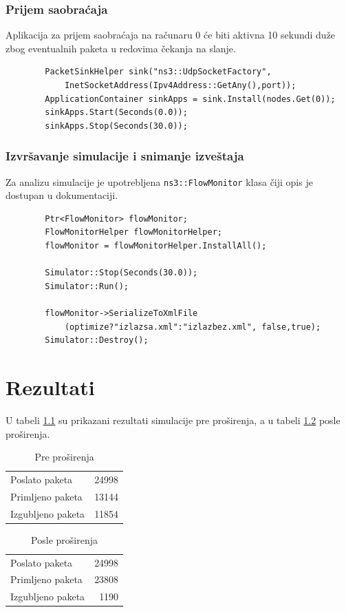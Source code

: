 \documentclass[a4paper, 12pt, projekat]{etf}
\begin{document}
	\subsection{Prijem saobraćaja}
	Aplikacija za prijem saobraćaja na računaru 0 će biti aktivna 10 sekundi duže zbog eventualnih paketa u redovima čekanja na slanje.
	\begin{verbatim}
		PacketSinkHelper sink("ns3::UdpSocketFactory",
		    InetSocketAddress(Ipv4Address::GetAny(),port));
		ApplicationContainer sinkApps = sink.Install(nodes.Get(0));
		sinkApps.Start(Seconds(0.0));
		sinkApps.Stop(Seconds(30.0));
	\end{verbatim}
	\subsection{Izvršavanje simulacije i snimanje izveštaja}
	Za analizu simulacije je upotrebljena \verb|ns3::FlowMonitor| klasa čiji opis je dostupan u dokumentaciji.\cite{ns3doc}
	\begin{verbatim}
		Ptr<FlowMonitor> flowMonitor;
		FlowMonitorHelper flowMonitorHelper;
		flowMonitor = flowMonitorHelper.InstallAll();
		
		Simulator::Stop(Seconds(30.0));
		Simulator::Run();
		
		flowMonitor->SerializeToXmlFile
		    (optimize?"izlazsa.xml":"izlazbez.xml", false,true);
		Simulator::Destroy();
	\end{verbatim}
	
	
	\chapter{Rezultati}
	U tabeli \ref{tab:pakpre} su prikazani rezultati simulacije pre pro\v{s}irenja, a u tabeli \ref{tab:pakposle} posle pro\v{s}irenja.
	\begin{table}[htb]
		\centering
		\caption{Pre pro\v{s}irenja}
		\label{tab:pakpre}
		\medskip
		\begin{tabular}{l|r}
			\hline
			Poslato paketa & 24998 \\
			Primljeno paketa & 13144 \\
			Izgubljeno paketa & 11854 \\
		\end{tabular}
	\end{table}
	\begin{table}[htb]
		\centering
		\caption{Posle pro\v{s}irenja}
		\label{tab:pakposle}
		\medskip
		\begin{tabular}{l|r}
			\hline
			Poslato paketa & 24998 \\
			Primljeno paketa & 23808 \\
			Izgubljeno paketa & 1190 
		\end{tabular}
	\end{table}
	
\end{document}
